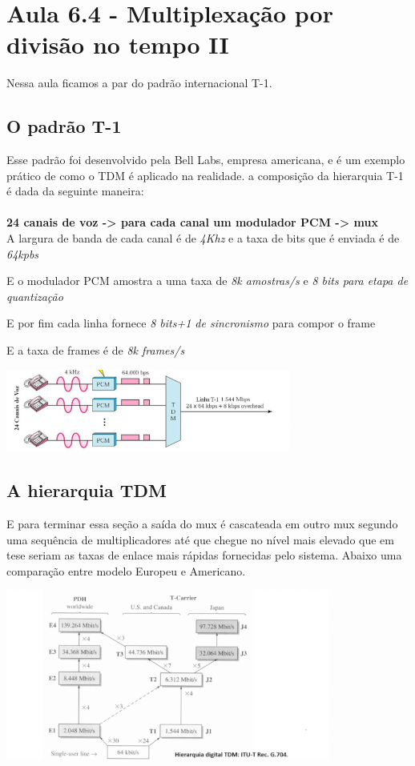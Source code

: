 \section{Aula 6.4 - Multiplexação por divisão no tempo II}

Nessa aula ficamos a par do padrão internacional T-1.

\subsection{O padrão T-1}

Esse padrão foi desenvolvido pela Bell Labs, empresa americana, e é um exemplo prático de como o TDM é aplicado na realidade.
a composição da hierarquia T-1 é dada da seguinte maneira:
\\\\
\textbf{24 canais de voz -> para cada canal um modulador PCM -> mux}
\\
A largura de banda de cada canal é de \textit{4Khz} e a taxa de bits que é enviada é de \textit{64kpbs}

E o modulador PCM amostra a uma taxa de \textit{8k amostras/s} e \textit{8 bits para etapa de quantização}

E por fim cada linha fornece \textit{8 bits+1 de sincronismo} para compor o frame

E a taxa de frames é de \textit{8k frames/s}

\includegraphics[width=0.7\textwidth]{../assets/tdm.png}\cite{dc}

\subsection{A hierarquia TDM}

E para terminar essa seção a saída do mux é cascateada em outro mux segundo uma sequência de multiplicadores até que chegue no nível mais elevado que em tese
seriam as taxas de enlace mais rápidas fornecidas pelo sistema. Abaixo uma comparação entre modelo Europeu e Americano.

\includegraphics[width=0.8\textwidth]{../assets/hire.png}\cite{dc}

